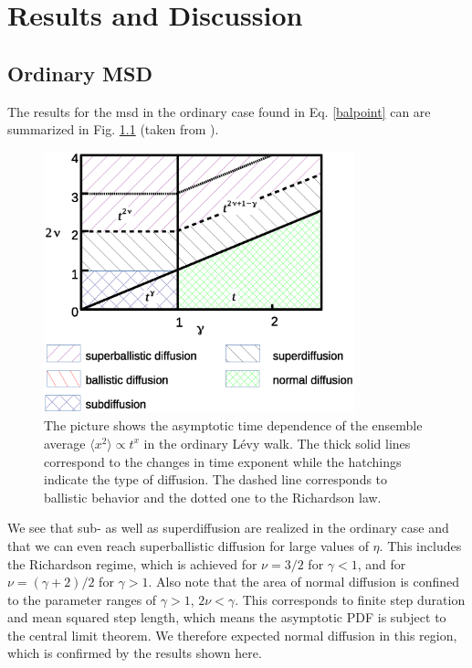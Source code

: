 \chapter{Results and Discussion}

\section{Ordinary MSD}



The results for the \gls{msd} in the ordinary case found in Eq. \ref{balpoint} can are summarized in Fig. \ref{fig:resultsMSDordinary} (taken from \cite{bothe}).

\begin{figure}[h!]
\begin{center}
\includegraphics[width=90mm]{pics/resultsMSDordinary.eps}
\caption{The picture shows the asymptotic time dependence of the ensemble average $\langle x^2 \rangle \propto t^{x}$ in the ordinary L\'evy walk. The thick solid lines correspond to the changes in time exponent while the hatchings indicate the type of diffusion. The dashed line corresponds to ballistic behavior and the dotted one to the Richardson law.
\label{fig:resultsMSDordinary} }
\end{center}
\end{figure} 

We see that sub- as well as superdiffusion are realized in the ordinary case and that we can even reach superballistic diffusion for large values of $\eta$. This includes the Richardson regime, which is achieved for $\nu = 3/2$ for $\gamma <1$, and for $\nu = (\gamma + 2)/2$ for $\gamma > 1$. Also note that the area of normal diffusion is confined to the parameter ranges of $\gamma>1$, $2\nu < \gamma$. This corresponds to finite step duration and mean squared step length, which means the asymptotic \gls{PDF} is subject to the central limit theorem. We therefore expected normal diffusion in this region, which is confirmed by the results shown here.\\

